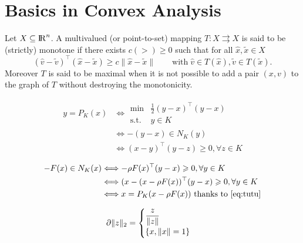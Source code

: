 \clearpage
\appendix

\section{Basics in Convex Analysis} \label{Sec:Ann:ConvexAnalysis}
\begin{definition}\label{def:MM}
 Let $X\subseteq \mathrm{I\!R}^n$. A multivalued (or point-to-set) mapping $T\colon X\rightrightarrows X$ is said to be (strictly) monotone if
 there exists $c (>) \geq 0$ such that for all $\hat{x}, \widetilde{x} \in X$
 \begin{equation}
  {(\hat{v} - \widetilde{v})}^\top(\hat{x} - \widetilde{x})\geq c \|\hat{x} - \widetilde{x}\|\qquad\text{with}\; \hat{v}\in T(\hat{x}), \widetilde{v}\in T(\widetilde{x}).
 \end{equation}
 Moreover $T$ is said to be maximal when it is not possible to add a pair $(x, v)$ to the graph of $T$ without destroying the monotonicity.
\end{definition}

\begin{align}
y = P_K(x) & \Longleftrightarrow 
\begin{array}{ll}
  \min &\frac 1 2 (y-x)^\top (y-x ) \\
  \text {s.t. } & y \in K
\end{array}
\\
& \Longleftrightarrow  - (y-x) \in N_K(y) \\
& \Longleftrightarrow  (x-y)^\top(y-z) \geq 0, \forall z \in K 
\label{eq:tutu}
\end{align}

\begin{align}
-F(x) \in N_K(x) & \Longleftrightarrow -\rho F(x)^\top(y-x) \geq 0, \forall y \in K\\
& \Longleftrightarrow  (x-(x - \rho F(x))^\top(y-x) \geq 0, \forall y \in K \\
& \Longleftrightarrow  x = P_K(x- \rho F(x)) \text{ thanks to~\eqref{eq:tutu}} 
\end{align}

\begin{equation}
  \label{eq:sub-norm}
  \partial \|z\|_2 =
  \begin{cases}
      \Frac z {\|z\|}\\
      \{x, \|x\|=1 \}
    \end{cases}
\end{equation}
